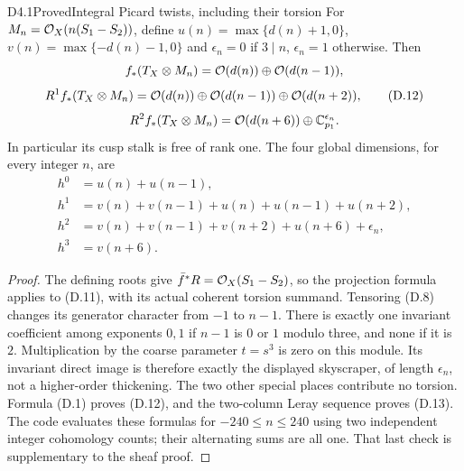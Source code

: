 \begin{claim}{D4.1}{Proved}{Integral Picard twists, including their torsion}
For $M_n=\mathcal O_X(n(S_1-S_2))$, define
$u(n)=\max\{d(n)+1,0\}$, $v(n)=\max\{-d(n)-1,0\}$ and
$\epsilon_n=0$ if $3\mid n$, $\epsilon_n=1$ otherwise. Then
\[
 f_*(T_X\otimes M_n)=\mathcal O(d(n))\oplus\mathcal O(d(n-1)),
\]
\[
 R^1f_*(T_X\otimes M_n)=
 \mathcal O(d(n))\oplus\mathcal O(d(n-1))\oplus\mathcal O(d(n+2)),           \tag{D.12}
\]
\[
 R^2f_*(T_X\otimes M_n)=
 \mathcal O(d(n+6))\oplus\mathbb C_{p_1}^{\epsilon_n}.
\]
In particular its cusp stalk is free of rank one. The four global
dimensions, for every integer $n$, are
\begin{align*}
 h^0&=u(n)+u(n-1),\\
 h^1&=v(n)+v(n-1)+u(n)+u(n-1)+u(n+2),\\
 h^2&=v(n)+v(n-1)+v(n+2)+u(n+6)+\epsilon_n,\\
 h^3&=v(n+6).                                          \tag{D.13}
\end{align*}
\end{claim}
\begin{proof}
The defining roots give $\bar f^*R=\mathcal O_X(S_1-S_2)$, so the projection
formula applies to (D.11), with its actual coherent torsion summand.
Tensoring (D.8) changes its generator character from $-1$ to $n-1$.
There is exactly one invariant coefficient among exponents $0,1$ if
$n-1$ is $0$ or $1$ modulo three, and none if it is $2$. Multiplication
by the coarse parameter $t=s^3$ is zero on this module. Its invariant
direct image is therefore exactly the displayed skyscraper, of
length $\epsilon_n$, not a higher-order thickening. The two other
special places contribute no torsion. Formula (D.1) proves (D.12),
and the two-column Leray sequence proves (D.13). The code evaluates
these formulas for $-240\le n\le240$ using two independent integer
cohomology counts; their alternating sums are all one. That last
check is supplementary to the sheaf proof.
\end{proof}

